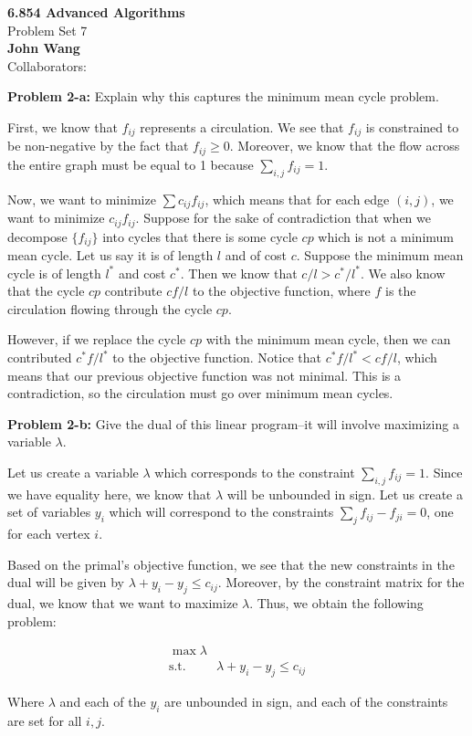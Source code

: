\documentclass[psamsfonts]{amsart}
\newenvironment{sol}{\vspace{0.25cm}{\large \bfseries Solution:}}{\qedsymbol}
\newenvironment{prob}[1]{\begin{framed}{\large \bfseries Problem #1:}}{\end{framed}}
\newcommand{\makenewtitle}{
    \begin{center}
    {\huge \bfseries 6.854 Advanced Algorithms} \\
    Problem Set 7\\
    \vspace{0.25cm}
    {\bfseries John Wang} \\
    Collaborators: 
    \end{center}
    \vspace{0.5cm}
}
\begin{document}
\newpage
\makenewtitle

\begin{prob}{2-a}
Explain why this captures the minimum mean cycle problem.
\end{prob}
\begin{sol}
First, we know that $f_{ij}$ represents a circulation. We see that $f_{ij}$ is constrained to be non-negative by the fact that $f_{ij} \geq 0$. Moreover, we know that the flow across the entire graph must be equal to 1 because $\sum_{i,j} f_{ij} = 1$. 

Now, we want to minimize $\sum c_{ij} f_{ij}$, which means that for each edge $(i,j)$, we want to minimize $c_{ij} f_{ij}$. Suppose for the sake of contradiction that when we decompose $\{ f_{ij} \}$ into cycles that there is some cycle $cp$ which is not a minimum mean cycle. Let us say it is of length $l$ and of cost $c$. Suppose the minimum mean cycle is of length $l^*$ and cost $c^*$. Then we know that $c/l > c^*/l^*$. We also know that the cycle $cp$ contribute $c f / l$ to the objective function, where $f$ is the circulation flowing through the cycle $cp$. 

However, if we replace the cycle $cp$ with the minimum mean cycle, then we can contributed $c^* f / l^*$ to the objective function. Notice that $c^* f / l^* < c f/l $, which means that our previous objective function was not minimal. This is a contradiction, so the circulation must go over minimum mean cycles.  
\end{sol}

\begin{prob}{2-b}
Give the dual of this linear program--it will involve maximizing a variable $\lambda$.
\end{prob}
\begin{sol}
Let us create a variable $\lambda$ which corresponds to the constraint $\sum_{i,j} f_{ij} = 1$. Since we have equality here, we know that $\lambda$ will be unbounded in sign. Let us create a set of variables $y_{i}$ which will correspond to the constraints $\sum_{j} f_{ij} - f_{ji} = 0$, one for each vertex $i$. 

Based on the primal's objective function, we see that the new constraints in the dual will be given by $\lambda + y_i - y_j \leq c_{ij}$. Moreover, by the constraint matrix for the dual, we know that we want to maximize $\lambda$. Thus, we obtain the following problem:

\begin{eqnarray}
\max \lambda \\
\text{s.t.} \hspace{1cm} \lambda + y_i - y_j \leq c_{ij}
\end{eqnarray}

Where $\lambda$ and each of the $y_i$ are unbounded in sign, and each of the constraints are set for all $i,j$. 
\end{sol}
\end{document}
